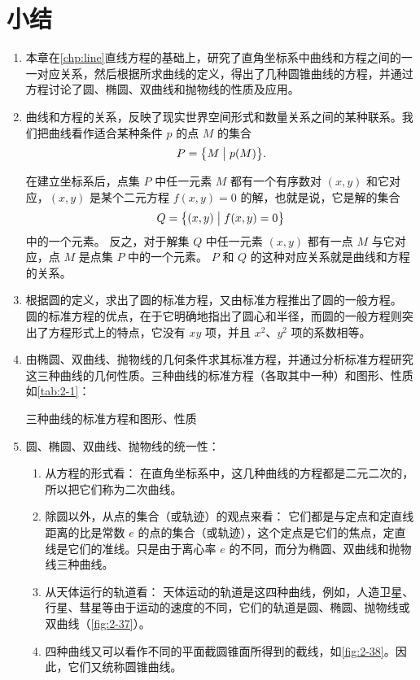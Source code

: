 \section*{小结}
\begin{enumerate}[C、,itemindent=4.5em]
  \item 本章在\cref{chp:line}直线方程的基础上，研究了直角坐标系中曲线和方程之间的一一对应关系，然后根据所求曲线的定义，得出了几种圆锥曲线的方程，并通过方程讨论了圆、椭圆、双曲线和抛物线的性质及应用。
  \item 曲线和方程的关系，反映了现实世界空间形式和数量关系之间的某种联系。我们把曲线看作适合某种条件 $p$ 的点 $M$ 的集合
  \[ P = \bigl\{ M \bigm\vert p(M) \bigr\}. \]

  在建立坐标系后，点集 $P$ 中任一元素 $M$ 都有一个有序数对 $(x,y)$ 和它对应，$(x,y)$ 是某个二元方程 $f(x,y)=0$ 的解，也就是说，它是解的集合
  \[ Q = \bigl\{ (x,y) \bigm\vert f(x,y)= 0 \bigr\}\]
  中的一个元素。
  反之，对于解集 $Q$ 中任一元素 $(x,y)$ 都有一点 $M$ 与它对应，点 $M$ 是点集 $P$ 中的一个元素。
  $P$ 和 $Q$ 的这种对应关系就是曲线和方程的关系。
  \item 根据圆的定义，求出了圆的标准方程，又由标准方程推出了圆的一般方程。
  圆的标准方程的优点，在于它明确地指出了圆心和半径，而圆的一般方程则突出了方程形式上的特点，它没有 $xy$ 项，并且 $x^2$、$y^2$ 项的系数相等。
  \item 由椭圆、双曲线、抛物线的几何条件求其标准方程，并通过分析标准方程研究这三种曲线的几何性质。三种曲线的标准方程（各取其中一种）和图形、性质如\cref{tab:2-1}：
  \begin{table}
    \caption{三种曲线的标准方程和图形、性质}\label{tab:2-1}
  \end{table}
  \item 圆、椭圆、双曲线、抛物线的统一性：
  \begin{enumerate}[(1)]
    \item 从方程的形式看： 在直角坐标系中，这几种曲线的方程都是二元二次的，所以把它们称为二次曲线。
    \item 除圆以外，从点的集合（或轨迹）的观点来看： 它们都是与定点和定直线距离的比是常数 $e$ 的点的集合（或轨迹），这个定点是它们的焦点，定直线是它们的准线。只是由于离心率 $e$ 的不同，而分为椭圆、双曲线和抛物线三种曲线。
    \item 从天体运行的轨道看： 天体运动的轨道是这四种曲线，例如，人造卫星、行星、彗星等由于运动的速度的不同，它们的轨道是圆、椭圆、抛物线或双曲线（\cref{fig:2-37}）。
    \item 四种曲线又可以看作不同的平面截圆锥面所得到的截线，如\cref{fig:2-38}。因此，它们又统称圆锥曲线。

\end{enumerate}
\end{enumerate}
